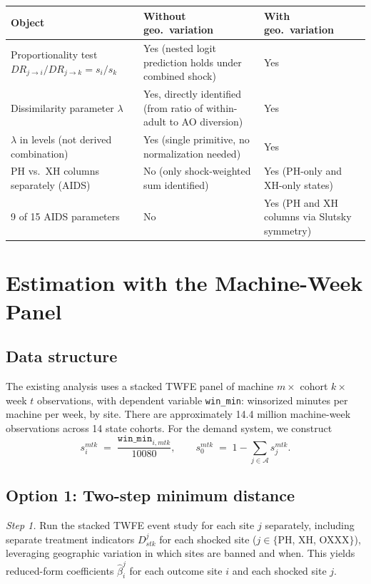 \documentclass{article}
\begin{document}
\begin{center}
\renewcommand{\arraystretch}{1.3}
\begin{tabular}{p{5.1cm} p{4.1cm} p{4.1cm}}
  \toprule
  Object & Without geo.\ variation & With geo.\ variation \\
  \midrule
  Proportionality test $DR_{j\to i}/DR_{j\to k} = s_i/s_k$
  & Yes (nested logit prediction holds under combined shock)
  & Yes \\[4pt]
  Dissimilarity parameter $\lambda$
  & Yes, directly identified (from ratio of within-adult to AO diversion)
  & Yes \\[4pt]
  $\lambda$ in levels (not derived combination)
  & Yes (single primitive, no normalization needed)
  & Yes \\[4pt]
  PH vs.\ XH columns separately (AIDS)
  & No (only shock-weighted sum identified)
  & Yes (PH-only and XH-only states) \\[4pt]
  9 of 15 AIDS parameters
  & No
  & Yes (PH and XH columns via Slutsky symmetry) \\
  \bottomrule
\end{tabular}
\end{center}

\bigskip

\section{Estimation with the Machine-Week Panel}

\subsection{Data structure}

The existing analysis uses a stacked TWFE panel of machine $m \times$
cohort $k \times$ week $t$ observations, with dependent variable
\texttt{win\_min}: winsorized minutes per machine per week, by site.
There are approximately 14.4 million machine-week observations across 14
state cohorts.  For the demand system, we construct
\[
  s_i^{mtk} \;=\; \frac{\texttt{win\_min}_{i,mtk}}{10080},
  \qquad
  s_0^{mtk} \;=\; 1 - \sum_{j \in \mathcal{A}} s_j^{mtk}.
\]

\subsection{Option 1: Two-step minimum distance}

\emph{Step 1.} Run the stacked TWFE event study for each site $j$ separately,
including separate treatment indicators $D_{stk}^j$ for each shocked site
($j \in \{$PH, XH, OXXX$\}$), leveraging geographic variation in which
sites are banned and when.  This yields reduced-form coefficients
$\hat\beta_i^j$ for each outcome site $i$ and each shocked site $j$.
\end{document}
